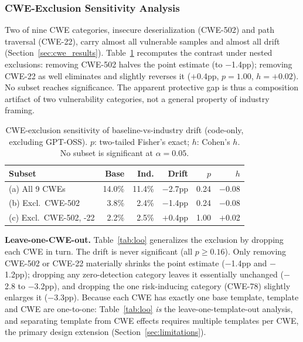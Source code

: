 \documentclass[sigconf,review,anonymous]{acmart}
\begin{document}
\subsubsection{CWE-Exclusion Sensitivity Analysis}
\label{sec:sensitivity}

Two of nine CWE categories, insecure deserialization (CWE-502) and path traversal (CWE-22), carry almost all vulnerable samples and almost all drift (Section~\ref{sec:cwe_results}). Table~\ref{tab:sensitivity} recomputes the contrast under nested exclusions: removing CWE-502 halves the point estimate (to $-$1.4pp); removing CWE-22 as well eliminates and slightly reverses it ($+$0.4pp, $p = 1.00$, $h = +0.02$). No subset reaches significance. The apparent protective gap is thus a composition artifact of two vulnerability categories, not a general property of industry framing.

\begin{table}[t]
\caption{CWE-exclusion sensitivity of baseline-vs-industry drift (code-only, excluding GPT-OSS). $p$: two-tailed Fisher's exact; $h$: Cohen's $h$. No subset is significant at $\alpha=0.05$.}
\label{tab:sensitivity}
\centering
\footnotesize
\begin{tabular}{lrrrrr}
\toprule
\textbf{Subset} & \textbf{Base} & \textbf{Ind.} & \textbf{Drift} & \textbf{$p$} & \textbf{$h$} \\
\midrule
(a) All 9 CWEs & 14.0\% & 11.4\% & $-$2.7pp & 0.24 & $-$0.08 \\
(b) Excl.\ CWE-502 & 3.8\% & 2.4\% & $-$1.4pp & 0.24 & $-$0.08 \\
(c) Excl.\ CWE-502, -22 & 2.2\% & 2.5\% & $+$0.4pp & 1.00 & $+$0.02 \\
\bottomrule
\end{tabular}
\end{table}

\textbf{Leave-one-CWE-out.} Table~\ref{tab:loo} generalizes the exclusion by dropping each CWE in turn. The drift is never significant (all $p \ge 0.16$). Only removing CWE-502 or CWE-22 materially shrinks the point estimate ($-$1.4pp and $-$1.2pp); dropping any zero-detection category leaves it essentially unchanged ($-$2.8 to $-$3.2pp), and dropping the one risk-inducing category (CWE-78) slightly enlarges it ($-$3.3pp). Because each CWE has exactly one base template, template and CWE are one-to-one: Table~\ref{tab:loo} \emph{is} the leave-one-template-out analysis, and separating template from CWE effects requires multiple templates per CWE, the primary design extension (Section~\ref{sec:limitations}).
\end{document}
